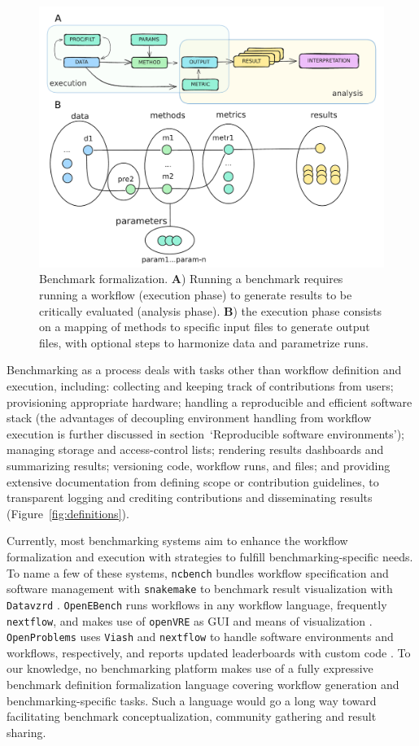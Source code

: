 \documentclass[11pt]{article}
\begin{document}
\begin{figure}
    \centering
    \includegraphics[width=0.75\linewidth]{../original_submission/figures/bens_formalization.pdf}
    \caption[Benchmark formalization.]{Benchmark formalization. \textbf{A}) Running a benchmark requires running a workflow (execution phase) to generate results to be critically evaluated (analysis phase). \textbf{B}) the execution phase consists on a mapping of methods to specific input files to generate output files, with optional steps to harmonize data and parametrize runs.}
    \label{fig:formalization}
\end{figure}

Benchmarking as a process deals with tasks other than workflow definition and execution, including: collecting and keeping track of contributions from users; provisioning appropriate hardware; handling a reproducible and efficient software stack {\color{red}(the advantages of decoupling environment handling from workflow execution is further discussed in section~`Reproducible software environments')}; managing storage and access-control lists; rendering results dashboards and summarizing results; versioning code, workflow runs, and files; and providing extensive documentation from defining scope or contribution guidelines, to transparent logging and crediting contributions and disseminating results {\color{red}(Figure~\ref{fig:definitions})}.

Currently, most benchmarking systems aim to enhance the workflow formalization and execution with strategies to fulfill benchmarking-specific needs. To name a few of these systems, \texttt{ncbench} bundles workflow specification and software management with \texttt{snakemake} to benchmark result visualization with \texttt{Datavzrd} \cite{Hanssen2023-uf}. \texttt{OpenEBench} runs workflows in any workflow language, frequently \texttt{nextflow}, and makes use of \texttt{openVRE} as GUI and means of visualization \cite{Capella-Gutierrez2017-dh}. \texttt{OpenProblems} uses \texttt{Viash} and \texttt{nextflow} to handle software environments and workflows, respectively, and reports updated leaderboards with custom code \cite{Luecken2024-fk}. To our knowledge, no benchmarking platform makes use of a fully expressive benchmark definition formalization language covering workflow generation and benchmarking-specific tasks. Such a language would go a long way toward facilitating benchmark conceptualization, community gathering and result sharing.
\end{document}
